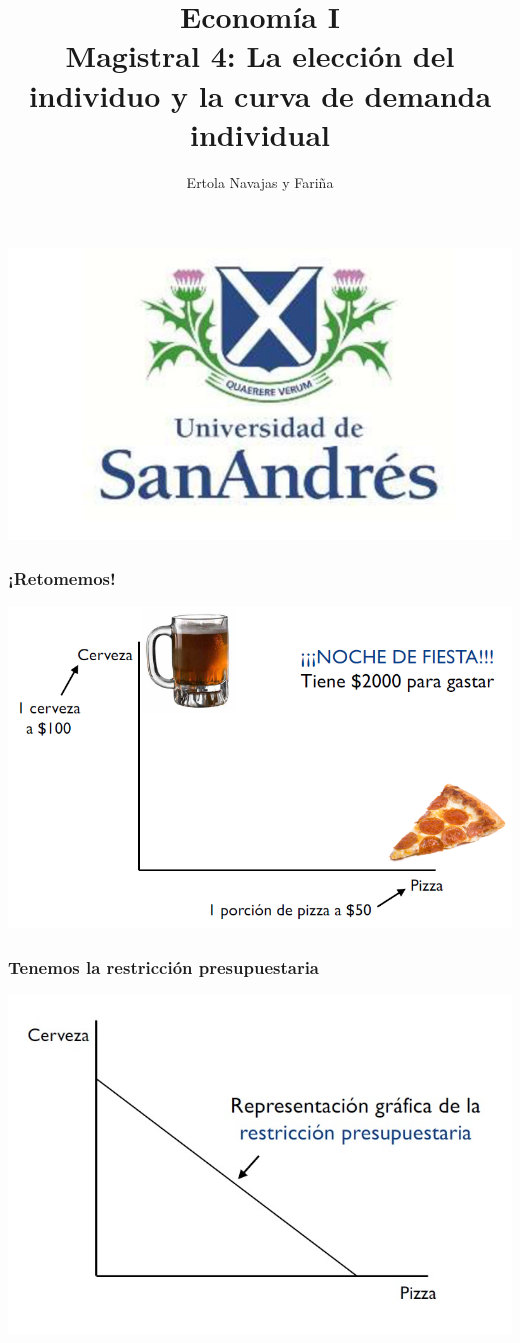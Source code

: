 \documentclass{beamer}
\title[Economía I]{Economía I \vspace{4mm}
\\ Magistral 4: La elección del individuo y la curva de demanda individual}
\date{}
\author[Ertola Navajas y Fariña]{Ertola Navajas y Fariña}
\institute[]{Universidad de San Andrés}
\begin{document}
\begin{frame}
\titlepage
\centering
\includegraphics[scale=0.2]{Slides Principios de Economia/Figures/logoUDESA.jpg} 
\end{frame}

\begin{frame}
\frametitle{¡Retomemos!}
\centering
\includegraphics[scale=0.5]{Slides Principios de Economia/Figures/Tema_02.2_rp.png}
\end{frame}

\begin{frame}
\frametitle{Tenemos la restricción presupuestaria}
\centering
\includegraphics[scale=0.6]{Slides Principios de Economia/Figures/Tema_02.4_rp2.jpg}
\end{frame}
\end{document}
